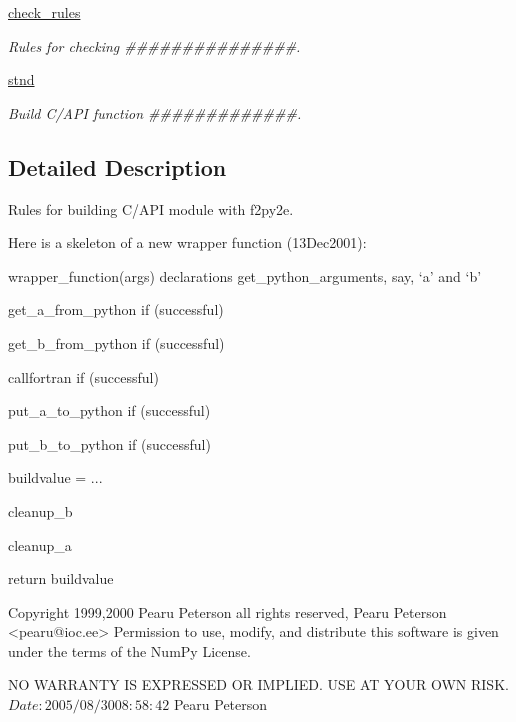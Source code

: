 \begin{DoxyCompactItemize}
\item 
\hyperlink{namespacenumpy_1_1f2py_1_1rules_a2d1da00f98ab5c406b94cfe7984a0fe4}{check\+\_\+rules}
\begin{DoxyCompactList}\small\item\em Rules for checking \#\#\#\#\#\#\#\#\#\#\#\#\#\#\#. \end{DoxyCompactList}\item 
\hyperlink{namespacenumpy_1_1f2py_1_1rules_ae0d151e1a7fb06ac77e0c188f9fbbe16}{stnd}
\begin{DoxyCompactList}\small\item\em Build C/\+A\+PI function \#\#\#\#\#\#\#\#\#\#\#\#\#. \end{DoxyCompactList}\end{DoxyCompactItemize}


\subsection{Detailed Description}
\begin{DoxyVerb}Rules for building C/API module with f2py2e.

Here is a skeleton of a new wrapper function (13Dec2001):

wrapper_function(args)
  declarations
  get_python_arguments, say, `a' and `b'

  get_a_from_python
  if (successful) {

    get_b_from_python
    if (successful) {

      callfortran
      if (successful) {

        put_a_to_python
        if (successful) {

          put_b_to_python
          if (successful) {

buildvalue = ...

          }

        }

      }

    }
    cleanup_b

  }
  cleanup_a

  return buildvalue

Copyright 1999,2000 Pearu Peterson all rights reserved,
Pearu Peterson <pearu@ioc.ee>
Permission to use, modify, and distribute this software is given under the
terms of the NumPy License.

NO WARRANTY IS EXPRESSED OR IMPLIED.  USE AT YOUR OWN RISK.
$Date: 2005/08/30 08:58:42 $
Pearu Peterson\end{DoxyVerb}
 

